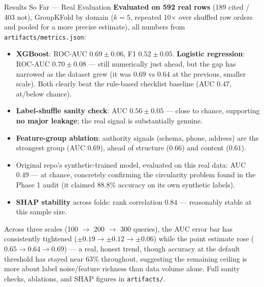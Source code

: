 \documentclass[aspectratio=169]{beamer}
\begin{document}
\begin{frame}{Results So Far — Real Evaluation}
  \textbf{Evaluated on 592 real rows} (189 cited / 403 not), GroupKFold by domain ($k=5$, repeated 10$\times$ over shuffled row orders and pooled for a more precise estimate), all numbers from \texttt{artifacts/metrics.json}:
  \begin{itemize}
    \item \textbf{XGBoost}: ROC-AUC $0.69 \pm 0.06$, F1 $0.52 \pm 0.05$. \textbf{Logistic regression}: ROC-AUC $0.70 \pm 0.08$ — still numerically just ahead, but the gap has narrowed as the dataset grew (it was $0.69$ vs $0.64$ at the previous, smaller scale). Both clearly beat the rule-based checklist baseline (AUC $0.47$, at/below chance).
    \item \textbf{Label-shuffle sanity check}: AUC $0.56 \pm 0.05$ — close to chance, supporting \textbf{no major leakage}; the real signal is substantially genuine.
    \item \textbf{Feature-group ablation}: authority signals (schema, phone, address) are the strongest group (AUC $0.69$), ahead of structure ($0.66$) and content ($0.61$).
    \item \alert{Original repo's synthetic-trained model, evaluated on this real data: AUC $0.49$} — at chance, concretely confirming the circularity problem found in the Phase 1 audit (it claimed 88.8\% accuracy on its own synthetic labels).
    \item \textbf{SHAP stability} across folds: rank correlation $0.84$ — reasonably stable at this sample size.
  \end{itemize}
  \small Across three scales (100 $\to$ 200 $\to$ 300 queries), the AUC error bar has consistently tightened ($\pm0.19 \to \pm0.12 \to \pm0.06$) while the point estimate rose ($0.65 \to 0.64 \to 0.69$) — a real, honest trend, though accuracy at the default threshold has stayed near 63\% throughout, suggesting the remaining ceiling is more about label noise/feature richness than data volume alone. Full sanity checks, ablations, and SHAP figures in \texttt{artifacts/}.
\end{frame}
\end{document}
